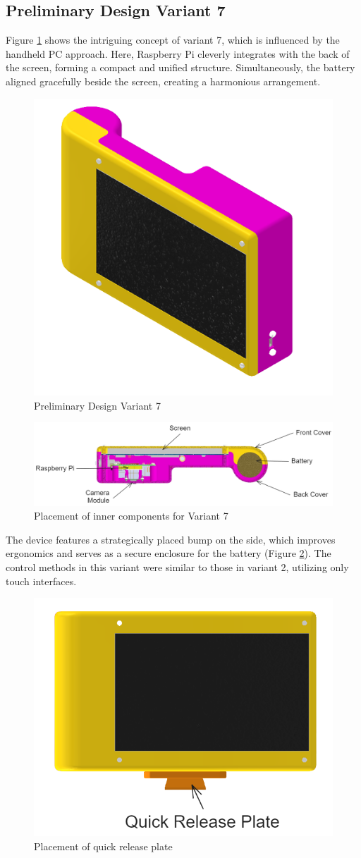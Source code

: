 \subsection{Preliminary Design Variant 7}
Figure \ref{fig:preliminary_design_variant_7} shows the intriguing concept of variant 7, which is influenced by the handheld PC approach. Here, Raspberry Pi cleverly integrates with the back of the screen, forming a compact and unified structure. Simultaneously, the battery aligned gracefully beside the screen, creating a harmonious arrangement.

\begin{figure}[h!]
    \centering
    \includegraphics[height=5 cm]{texs/Part1/chapter4/image/v71.png}
    \caption{Preliminary Design Variant 7}
    \label{fig:preliminary_design_variant_7}
\end{figure}

\begin{figure}[h!]
    \centering
    \includegraphics[height=3 cm]{texs/Part1/chapter4/image/v72.png}
    \caption{Placement of inner components for Variant 7}
    \label{fig:variant7_inner_components}
\end{figure}

The device features a strategically placed bump on the side, which improves ergonomics and serves as a secure enclosure for the battery (Figure \ref{fig:variant7_inner_components}). The control methods in this variant were similar to those in variant 2, utilizing only touch interfaces.

\begin{figure}[h!]
    \centering
    \includegraphics[height=5 cm]{texs/Part1/chapter4/image/v73.png}
    \caption{Placement of quick release plate}
    \label{fig:variant7_quick_release_plate}
\end{figure}

